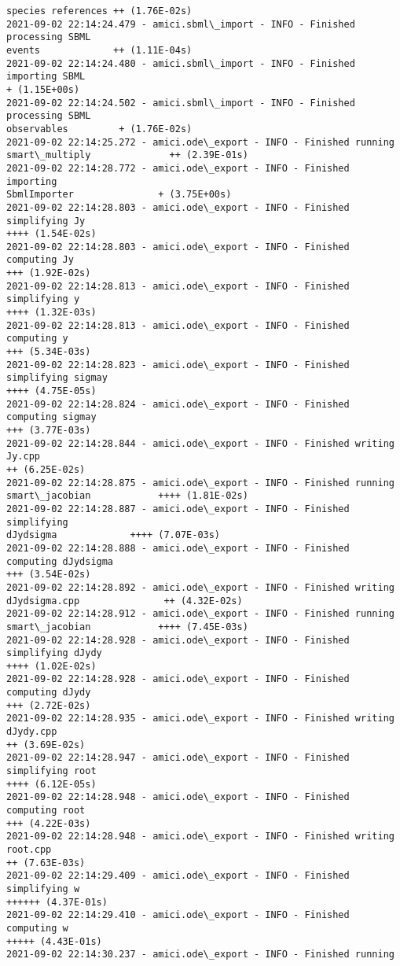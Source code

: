 \documentclass[11pt]{article}
\begin{document}
\begin{Verbatim}[commandchars=\\\{\}]
species references ++ (1.76E-02s)
2021-09-02 22:14:24.479 - amici.sbml\_import - INFO - Finished processing SBML
events             ++ (1.11E-04s)
2021-09-02 22:14:24.480 - amici.sbml\_import - INFO - Finished importing SBML
+ (1.15E+00s)
2021-09-02 22:14:24.502 - amici.sbml\_import - INFO - Finished processing SBML
observables         + (1.76E-02s)
2021-09-02 22:14:25.272 - amici.ode\_export - INFO - Finished running
smart\_multiply              ++ (2.39E-01s)
2021-09-02 22:14:28.772 - amici.ode\_export - INFO - Finished importing
SbmlImporter               + (3.75E+00s)
2021-09-02 22:14:28.803 - amici.ode\_export - INFO - Finished simplifying Jy
++++ (1.54E-02s)
2021-09-02 22:14:28.803 - amici.ode\_export - INFO - Finished computing Jy
+++ (1.92E-02s)
2021-09-02 22:14:28.813 - amici.ode\_export - INFO - Finished simplifying y
++++ (1.32E-03s)
2021-09-02 22:14:28.813 - amici.ode\_export - INFO - Finished computing y
+++ (5.34E-03s)
2021-09-02 22:14:28.823 - amici.ode\_export - INFO - Finished simplifying sigmay
++++ (4.75E-05s)
2021-09-02 22:14:28.824 - amici.ode\_export - INFO - Finished computing sigmay
+++ (3.77E-03s)
2021-09-02 22:14:28.844 - amici.ode\_export - INFO - Finished writing Jy.cpp
++ (6.25E-02s)
2021-09-02 22:14:28.875 - amici.ode\_export - INFO - Finished running
smart\_jacobian            ++++ (1.81E-02s)
2021-09-02 22:14:28.887 - amici.ode\_export - INFO - Finished simplifying
dJydsigma             ++++ (7.07E-03s)
2021-09-02 22:14:28.888 - amici.ode\_export - INFO - Finished computing dJydsigma
+++ (3.54E-02s)
2021-09-02 22:14:28.892 - amici.ode\_export - INFO - Finished writing
dJydsigma.cpp               ++ (4.32E-02s)
2021-09-02 22:14:28.912 - amici.ode\_export - INFO - Finished running
smart\_jacobian            ++++ (7.45E-03s)
2021-09-02 22:14:28.928 - amici.ode\_export - INFO - Finished simplifying dJydy
++++ (1.02E-02s)
2021-09-02 22:14:28.928 - amici.ode\_export - INFO - Finished computing dJydy
+++ (2.72E-02s)
2021-09-02 22:14:28.935 - amici.ode\_export - INFO - Finished writing dJydy.cpp
++ (3.69E-02s)
2021-09-02 22:14:28.947 - amici.ode\_export - INFO - Finished simplifying root
++++ (6.12E-05s)
2021-09-02 22:14:28.948 - amici.ode\_export - INFO - Finished computing root
+++ (4.22E-03s)
2021-09-02 22:14:28.948 - amici.ode\_export - INFO - Finished writing root.cpp
++ (7.63E-03s)
2021-09-02 22:14:29.409 - amici.ode\_export - INFO - Finished simplifying w
++++++ (4.37E-01s)
2021-09-02 22:14:29.410 - amici.ode\_export - INFO - Finished computing w
+++++ (4.43E-01s)
2021-09-02 22:14:30.237 - amici.ode\_export - INFO - Finished running

\end{Verbatim}
\end{document}
